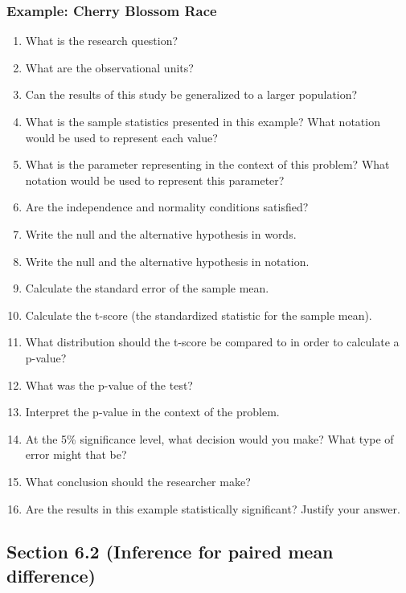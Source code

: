 \documentclass[
]{report}
\newcommand{\rgs}{\vspace{12pt}} %
\begin{document}
\hypertarget{example-cherry-blossom-race}{%
\subsubsection*{Example: Cherry Blossom Race}\label{example-cherry-blossom-race}}

\begin{enumerate}
\def\labelenumi{\arabic{enumi}.}
\item
  What is the research question?
  \rgs
\item
  What are the observational units?
  \rgs
\item
  Can the results of this study be generalized to a larger population?
  \rgs
\item
  What is the sample statistics presented in this example? What notation would be used to represent each value?
  \rgs
\item
  What is the parameter representing in the context of this problem? What notation would be used to represent this parameter?
  \rgs
  \rgs
\item
  Are the independence and normality conditions satisfied?
  \rgs
  \rgs
\item
  Write the null and the alternative hypothesis in words.
  \rgs
  \rgs
\item
  Write the null and the alternative hypothesis in notation.
  \rgs
\item
  Calculate the standard error of the sample mean.
  \rgs
\item
  Calculate the t-score (the standardized statistic for the sample mean).
  \rgs
\item
  What distribution should the t-score be compared to in order to calculate a p-value?
  \rgs
\item
  What was the p-value of the test?
  \rgs
\item
  Interpret the p-value in the context of the problem.
  \rgs
  \rgs
\item
  At the 5\% significance level, what decision would you make? What type of error might that be?
  \rgs
\item
  What conclusion should the researcher make?
  \rgs
\item
  Are the results in this example statistically significant? Justify your answer.
  \rgs
\end{enumerate}

\hypertarget{section-6.2-inference-for-paired-mean-difference}{%
\subsection*{Section 6.2 (Inference for paired mean difference)}\label{section-6.2-inference-for-paired-mean-difference}}
\end{document}
